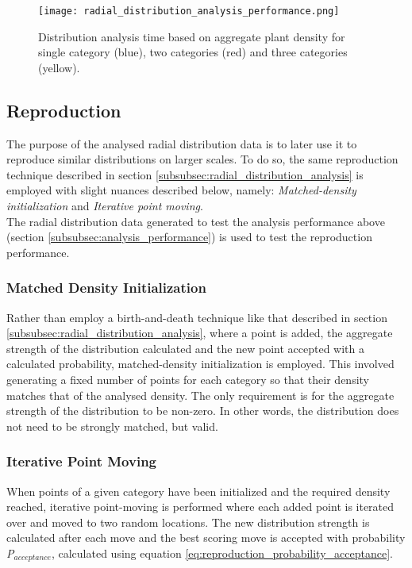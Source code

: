 \begin{figure}
\center
	\texttt{[image: radial\_distribution\_analysis\_performance.png]}
	\caption{ Distribution analysis time based on aggregate plant density for single category (blue), two categories (red) and three categories (yellow).}	
	\label{fig:analysis_perf}
\end{figure}

\subsection{Reproduction}

The purpose of the analysed radial distribution data is to later use it to reproduce similar distributions on larger scales. To do so, the same reproduction technique described in section \ref{subsubsec:radial_distribution_analysis} is employed with slight nuances described below, namely: \textit{Matched-density initialization} and \textit{Iterative point moving}.\\

The radial distribution data generated to test the analysis performance above (section \ref{subsubsec:analysis_performance}) is used to test the reproduction performance.

\subsubsection{Matched Density Initialization}

Rather than employ a birth-and-death technique like that described in section \ref{subsubsec:radial_distribution_analysis}, where a point is added, the aggregate strength of the distribution calculated and the new point accepted with a calculated probability, matched-density initialization is employed. This involved generating a fixed number of points for each category so that their density matches that of the analysed density. The only requirement is for the aggregate strength of the distribution to be non-zero. In other words, the distribution does not need to be strongly matched, but valid.

\subsubsection{Iterative Point Moving} \label{subsubsec:iterative_point_moving}

When points of a given category have been initialized and the required density reached, iterative point-moving is performed where each added point is iterated over and moved to two random locations. The new distribution strength is calculated after each move and the best scoring move is accepted with probability \textit{P$_{acceptance}$}, calculated using equation \ref{eq:reproduction_probability_acceptance}. 

